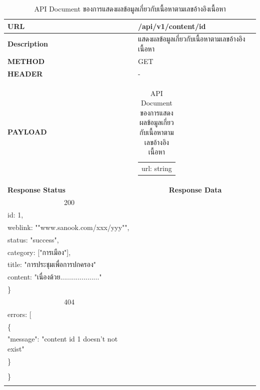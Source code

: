 \documentclass[12pt,oneside,openright,a4paper]{cpe-thai-project}
\begin{document}
\begin{longtable}[!ht]{p{3cm}|p{8cm}}
  \caption{API Document ของการแสดงผลข้อมูลเกี่ยวกับเนื้อหาตามเลขอ้างอิงเนื้อหา  }\label{tbl:api_content_id} 
    \endfirsthead
    \endhead
    \hhline{==} 
    \textbf{URL}              & /api/v1/content/{id}                                                                                             \\ \hline
    \textbf{Description}      & แสดงผลข้อมูลเกี่ยวกับเนื้อหาตามเลขอ้างอิงเนื้อหา                                                                                     \\ \hline
    \textbf{METHOD}           & GET                                                                                                                 \\ \hline
    \textbf{HEADER}           & -                                                                                         \\ \hline
    \textbf{PAYLOAD}          & \begin{tabular}[c]{@{}l@{}}url: string\end{tabular}  \\ \hline \newpage \hline
    \textbf{Response Status}  & \multicolumn{1}{c}{\textbf{Response Data}}                                                                          \\ \hline
    \multicolumn{1}{c|}{200}  &
    \begin{tabular}[c]{@{}l@{}}\{\\ \quad id: 1,\\ \quad weblink: ""www.sanook.com/xxx/yyy"",\\ \quad status: "success",\\ 
      \quad category: {[}"การเมือง"{]},\\ \quad title: "การประชุมเพื่อการปกครอง"\\ \quad content: "เนื่องด้วย...................."\\ \}\end{tabular}  \\ \hline
    \multicolumn{1}{c|}{404}  &
    \begin{tabular}[c]{@{}l@{}}\{\\ \quad errors: {[}\\ \quad\quad\{\\ \quad\quad\quad"message": "content id 1 doesn't not exist"\\ \quad\quad\}\\\quad {]}\\ \}\end{tabular}                                                                         \\ \hline
    \hhline{==} 
\end{longtable}
\end{document}
